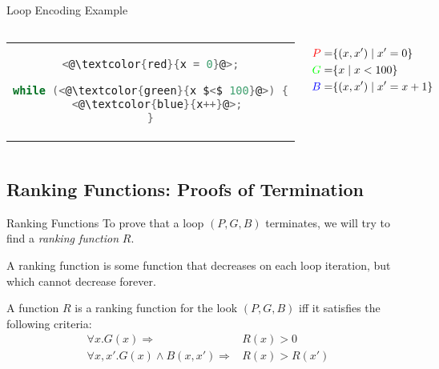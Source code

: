 \documentclass[xcolor=pdftex,t,11pt]{beamer}
\begin{document}
\begin{frame}[fragile]{Loop Encoding Example}

\begin{columns}[c]

 \begin{center}
 \begin{tabular}{c}

 \begin{lstlisting}[language=C,basicstyle=\normalsize,mathescape]
<@\textcolor{red}{x = 0}@>;

while (<@\textcolor{green}{x $<$ 100}@>) {
  <@\textcolor{blue}{x++}@>;
}
 \end{lstlisting}
 \end{tabular}
 \end{center}

\begin{align*}
 \textcolor{red}{P} = & \{ (x, x') \mid x' = 0 \} \\
 \textcolor{green}{G} = & \{ x \mid x < 100 \} \\
 \textcolor{blue}{B} = & \{ (x, x') \mid x' = x + 1 \}
\end{align*}
\end{columns}

\end{frame}



\subsection{Ranking Functions: Proofs of Termination}

\begin{frame}[fragile]{Ranking Functions}
 To prove that a loop $(P, G, B)$ terminates, we will try to find a \emph{ranking function} $R$.
 
 \vspace{1em}
 
 A ranking function is some function that decreases on each loop iteration, but which cannot decrease forever.
 
 \vspace{1em}
 
 A function $R$ is a ranking function for the look $(P, G, B)$ iff it satisfies the following criteria:
 \begin{align*}
  \forall x . G(x) \Rightarrow & R(x) > 0 \\
  \forall x, x' . G(x) \wedge B(x, x') \Rightarrow & R(x) > R(x')
 \end{align*}
\end{frame}
\end{document}
